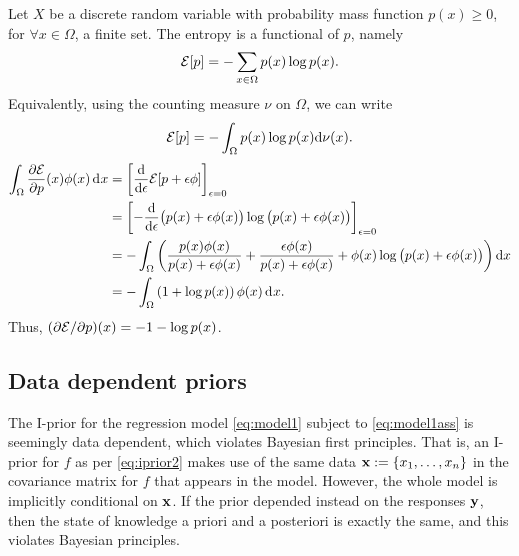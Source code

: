 \begin{example}
  Let $X$ be a discrete random variable with probability mass function $p(x) \geq 0$, for $\forall x \in \Omega$, a finite set.
  The entropy is a functional of $p$, namely
  \[
    {\mathcal E}[p] = - \sum_{x\in\Omega} p(x)\log p(x).
  \]
  Equivalently, using the counting measure $\nu$ on $\Omega$, we can write
  \[
    {\mathcal E}[p] = -\int_\Omega p(x) \log p(x) \text{d}\nu(x).
  \]
  \begin{align*}
    \int_\Omega \frac{\partial{\mathcal E}}{\partial p}(x)\phi(x) \operatorname{d}\hspace{0.5pt}\! x
    &= \left[ \frac{\text{d}}{\text{d} \epsilon} {\mathcal E}[p +  \epsilon\phi] \right]_{\epsilon=0} \\
    &= \left[ -\frac{\text{d}}{\text{d} \epsilon} 
    \big( p(x) + \epsilon\phi(x) \big) 
    \log \big(p(x) + \epsilon\phi(x) \big) 
    \right]_{\epsilon=0} \\
    &= -\int_\Omega \left( 
    \frac{p(x)\phi(x)}{p(x)+\epsilon\phi(x)}
    + \frac{\epsilon\phi(x)}{p(x) + \epsilon\phi(x)}
    + \phi(x)\log\big( p(x) + \epsilon\phi(x) \big)
    \right) \text{d} x \\
    &= -\int_\Omega \left( 1 + \log p(x) \right) \phi(x) \operatorname{d}\hspace{0.5pt}\! x.
  \end{align*}
  Thus, $(\partial{\mathcal E}/\partial p)(x) = -1 -\log p(x)$.
\end{example}

\subsection{Data dependent priors}

The I-prior for the regression model \cref{eq:model1} subject to \cref{eq:model1ass} is seemingly data dependent, which violates Bayesian first principles.
That is, an I-prior for $f$ as per \cref{eq:iprior2} makes use of the same data ${\mathbf x}:=\{x_1,\dots,x_n\}$ in the covariance matrix for $f$ that appears in the model.
However, the whole model is implicitly conditional on ${\mathbf x}$.
If the prior depended instead on the responses ${\mathbf y}$, then the state of knowledge a priori and a posteriori is exactly the same, and this violates Bayesian principles.

